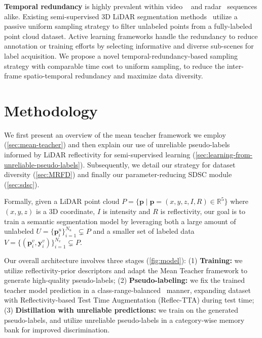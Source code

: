 \documentclass[10pt,twocolumn,letterpaper]{article}
\newcommand\bdtitle[1]{\noindent\textbf{#1}}
\begin{document}
\bdtitle{Temporal redundancy} is highly prevalent within video ~\cite{zhu2017deep,wang2022longshort} and radar~\cite{li2022exploiting} sequences alike. Existing semi-supervised 3D LiDAR segmentation methods~\cite{kong2022lasermix,Unal_2022_CVPR} utilize a passive uniform sampling strategy to filter unlabeled points from a fully-labeled point cloud dataset. Active learning frameworks handle the redundancy to reduce annotation or training efforts by selecting informative and diverse sub-scenes for label acquisition\cite{duong2017reducing,hu2022lidal,wu2021redala}.
We propose a novel temporal-redundancy-based sampling strategy with comparable time cost to uniform sampling, 
to reduce the inter-frame spatio-temporal redundancy and maximize data diversity. \vspace{-0.2cm}   
\section{Methodology}
\vspace{-0.2cm}




\noindent
We first present an overview of the mean teacher framework we employ (\cref{sec:mean-teacher}) and then explain our use of unreliable pseudo-labels informed by LiDAR reflectivity for semi-supervised learning (\cref{sec:learning-from-unreliable-pseudo-labels}). Subsequently, we detail our {\samplshort} strategy for dataset diversity (\cref{sec:MRFD}) and finally our parameter-reducing SDSC module (\cref{sec:sdsc}).

Formally, given a LiDAR point cloud $P=\{\textbf{p} \mid \textbf{p}=(x,y,z,I,R) \in \mathbb{R}^5\}$ where $(x,y,z)$ is a 3D coordinate, $I$ is intensity and $R$ is reflectivity, our goal is to train a semantic segmentation model by leveraging both a large amount of unlabeled $U = \{\textbf{p}_i^u\}_{i=1}^{N_u} \varsubsetneq P$ and a smaller set of labeled data $V = \{(\textbf{p}_i^v, \textbf{y}_i^v)\}_{i=1}^{N_v} \varsubsetneq P$. 


Our overall architecture involves three stages (\cref{fig:model}): (1) \textbf{Training:} we utilize reflectivity-prior descriptors and adapt the Mean Teacher framework to generate high-quality pseudo-labels; (2) \textbf{Pseudo-labeling:} we fix the trained teacher model prediction in a class-range-balanced~\cite{Unal_2022_CVPR} manner, expanding dataset with Reflectivity-based Test Time Augmentation (Reflec-TTA) during test time; (3) \textbf{Distillation with unreliable predictions:} we train on the generated pseudo-labels, and utilize unreliable pseudo-labels in a category-wise memory bank for improved discrimination.
\end{document}
